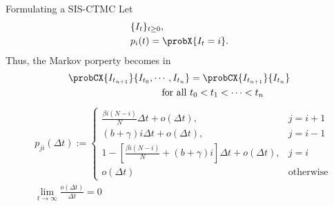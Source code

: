 \documentclass[9pt]{beamer}
\begin{document}
    \begin{frame}{Formulating a SIS-CTMC }
        Let 
        \begin{align*}
            & \{ I_t\}_{t \geq 0},
            \\
            & p_i(t) = \probX{I_t = i}.
        \end{align*}
        Thus, the Markov porperty becomes in
        \begin{align*}
            \probCX{ I_{t_{n + 1}}}{I_{t_0}, \cdots, I_{t_n} }
                &=
                \probCX{ I_{t_{n + 1}}}{I_{t_n}}
                \\
                \text{for all } &
                t_0 < t_1 < \cdots < t_n 
        \end{align*}
        \begin{align*}
            &p_{ji}(\Delta t):=
                \begin{cases}
                    \frac{\beta i (N - i)}{N} \Delta t 
                        + o(\Delta t),     
                        & j = i + 1
                    \\
                    (b + \gamma) i \Delta t 
                        + o(\Delta t),
                        &   j = i - 1
                    \\
                    1 - \left [
                            \frac{\beta i (N - i)}{N} +
                            (b + \gamma) i %
                        \right] \Delta t
                        + o(\Delta t) , 
                        & j=i
                    \\
                    o(\Delta t) & \text{otherwise}
                \end{cases}
            \\
            & \lim_{t\to \infty}
                \frac{o(\Delta t)}{\Delta t}
                = 0
        \end{align*}
    \end{frame}
\end{document}
